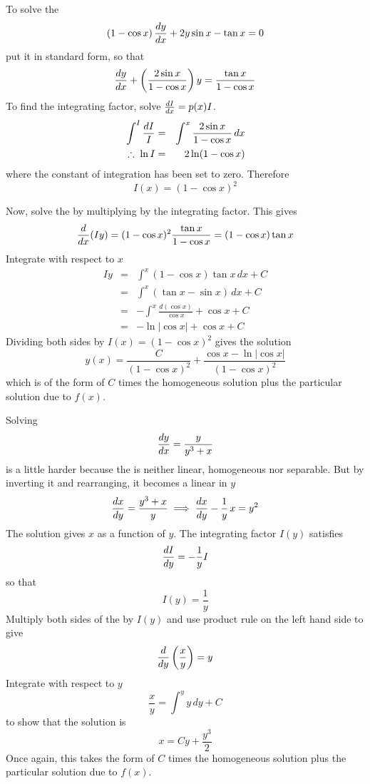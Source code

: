 \begin{example}
To solve the \ODE
$$\left(1-\cos x\right)\frac{dy}{dx}+2y\sin x-\tan x=0$$
put it in standard form, so that
$$\frac{dy}{dx}+\left(\frac{2\sin x}{1-\cos x}\right)y=\frac{\tan x}{1-\cos x}$$
To find the integrating factor, solve $\frac{dI}{dx}=p(x) I$.
\begin{eqnarray*}
\int^I\frac{dI}{I}&=&\int^x\frac{2\sin x}{1-\cos{x}}\,dx	\\
\;\therefore\; \ln I&=&2\ln(1-\cos x)
\end{eqnarray*}
where the constant of integration has been set to zero.  Therefore
$$I(x)=\left(1-\cos x\right)^2$$

Now, solve the \ODE by multiplying by the integrating factor.  This gives
$$\frac{d}{d{x}}(Iy)=(1-\cos x)^2\frac{\tan x}{1-\cos x}=(1-\cos x)\tan x$$
Integrate with respect to $x$
\begin{eqnarray*}
Iy&=&\int^x(1-\cos x)\tan x\,dx+C \\
&=&\int^x (\tan x -\sin x)\,dx+C \\
&=&-\int^x \frac{d(\cos x)}{\cos x}+\cos x+C \\
&=&-\ln\left|\cos x\right|+\cos x+C
\end{eqnarray*}
Dividing both sides by $I(x)=(1-\cos x)^2$ gives the solution
$$y(x)=\frac{C}{(1-\cos x)^2}
+\frac{\cos x-\ln\left|\cos x\right|}{(1-\cos x)^2}$$
which is of the form of $C$ times the homogeneous solution plus the
particular solution due to $f(x)$.
\end{example}

\begin{example}
Solving
$$\frac{dy}{dx}=\frac{y}{y^3+x}$$
is a little harder because the \ODE is neither linear, homogeneous nor 
separable.  But by inverting it and rearranging, it becomes a linear \ODE
in $y$
$$\frac{dx}{dy}=\frac{y^3+x}{y}\;\Longrightarrow\;\frac{dx}{dy}-\frac{1}{y}\,x=y^2$$
The solution gives $x$ as a function of $y$.  The integrating factor $I(y)$ 
satisfies
$$\frac{dI}{dy}=-\frac{1}{y}I$$
so that
$$I(y)=\frac{1}{y}$$
Multiply both sides of the \ODE by $I(y)$ and use product rule on the
left hand side to give
$$\frac{d}{d{y}}\left(\frac{x}{y}\right)=y$$
Integrate with respect to $y$ 
$$\frac{x}{y}=\int^y y\,dy+C$$
to show that the solution is
$$x=Cy+\frac{y^3}{2}$$
Once again, this takes the form of $C$ times the homogeneous solution 
plus the particular solution due to $f(x)$.
\end{example}

